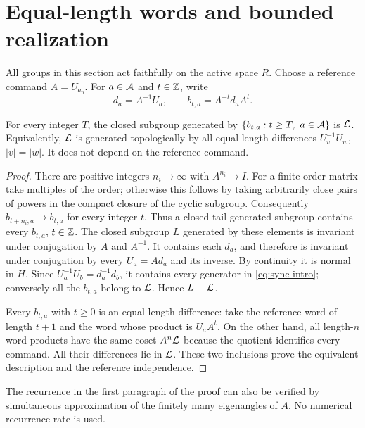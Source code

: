 \section{Equal-length words and bounded realization}\label{sec:sync45}
All groups in this section act faithfully on the active space $R$. Choose a reference command $A=U_{a_0}$. For $a\in\mathcal A$ and $t\in\mathbb Z$, write
\[
 d_a=A^{-1}U_a,\qquad b_{t,a}=A^{-t}d_a A^t.
\]

\begin{lemma}\label{lem:tail45}
For every integer $T$, the closed subgroup generated by
$\{b_{t,a}:t\ge T,\ a\in\mathcal A\}$ is $\mathcal L$. Equivalently, $\mathcal L$ is generated topologically by all equal-length differences $U_v^{-1}U_w$, $|v|=|w|$. It does not depend on the reference command.
\end{lemma}
\begin{proof}
There are positive integers $n_i\to\infty$ with $A^{n_i}\to I$. For a finite-order matrix take multiples of the order; otherwise this follows by taking arbitrarily close pairs of powers in the compact closure of the cyclic subgroup. Consequently $b_{t+n_i,a}\to b_{t,a}$ for every integer $t$. Thus a closed tail-generated subgroup contains every $b_{t,a}$, $t\in\mathbb Z$. The closed subgroup $L$ generated by these elements is invariant under conjugation by $A$ and $A^{-1}$. It contains each $d_a$, and therefore is invariant under conjugation by every $U_a=A d_a$ and its inverse. By continuity it is normal in $H$. Since $U_a^{-1}U_b=d_a^{-1}d_b$, it contains every generator in \eqref{eq:sync-intro}; conversely all the $b_{t,a}$ belong to $\mathcal L$. Hence $L=\mathcal L$.

Every $b_{t,a}$ with $t\ge0$ is an equal-length difference: take the reference word of length $t+1$ and the word whose product is $U_a A^t$. On the other hand, all length-$n$ word products have the same coset $A^n\mathcal L$ because the quotient identifies every command. All their differences lie in $\mathcal L$. These two inclusions prove the equivalent description and the reference independence.
\end{proof}

The recurrence in the first paragraph of the proof can also be verified by simultaneous approximation of the finitely many eigenangles of $A$. No numerical recurrence rate is used.

